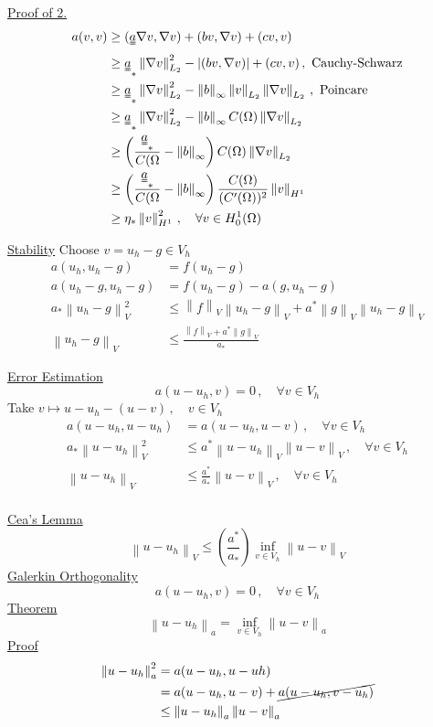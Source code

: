 \documentclass[letterpaper]{article}
\providecommand{\abs}[1]{\left\lvert#1\right\rvert}
\providecommand{\norm}[1]{\left\lVert#1\right\rVert}
\begin{document}
\begin{multicols}{2}
\uline{Proof of 2.}
\begin{align*}
a(v,v)&\ge(\uuline{a}\nabla v,\nabla v)+(bv,\nabla v)+(cv,v)\\
&\ge\uuline{a}_*\norm{\nabla v}_{L_2}^2-\abs{(bv,\nabla v)}+(cv,v)\,,
\text{ Cauchy-Schwarz}\\
&\ge\uuline{a}_*\norm{\nabla v}_{L_2}^2
-\norm{b}_\infty\norm{v}_{L_2}\norm{\nabla v}_{L_2}\,,\text{ Poincare}\\
&\ge\uuline{a}_*\norm{\nabla v}_{L_2}^2
-\norm{b}_\infty C(\Omega)\norm{\nabla v}_{L_2}\\
&\ge\left(\frac{\uuline{a}_*}{C(\Omega}
-\norm{b}_\infty\right) C(\Omega)\norm{\nabla v}_{L_2}\\
&\ge\left(\frac{\uuline{a}_*}{C(\Omega}
-\norm{b}_\infty\right)\frac{C(\Omega)}{(C'(\Omega))^2}\norm{v}_{H^1}\\
&\ge\eta_*\norm{v}_{H^1}^2\,,\quad\forall v\in H_0^1(\Omega)
\end{align*}

\uline{Stability} Choose $v=u_h-g\in V_h$
\begin{align*}
a(u_h,u_h-g)&=f(u_h-g)\\
a(u_h-g,u_h-g)&=f(u_h-g)-a(g,u_h-g)\\
a_*\norm{u_h-g}_V^2&\le\norm{f}_V\norm{u_h-g}_V+a^*\norm{g}_V\norm{u_h-g}_V\\
\norm{u_h-g}_V&\le\frac{\norm{f}_V+a^*\norm{g}_V}{a_*}
\end{align*}

\uline{Error Estimation} 
\[
a(u-u_h,v)=0\,,\quad\forall v\in V_h
\]
Take $v\mapsto u-u_h-(u-v)\,,\quad v\in V_h$
\begin{align*}
a(u-u_h,u-u_h)&=a(u-u_h,u-v)\,,\quad\forall v\in V_h\\
a_*\norm{u-u_h}_V^2&\le a^*\norm{u-u_h}_V\norm{u-v}_V\,,\quad\forall v\in V_h\\
\norm{u-u_h}_V&\le\frac{a^*}{a_*}\norm{u-v}_V\,,\quad\forall v\in V_h\\
\end{align*}

\uline{Cea's Lemma} 
\[
\norm{u-u_h}_V\le\left(\frac{a^*}{a_*}\right)\inf_{v\in V_h}\norm{u-v}_V
\]
\uline{Galerkin Orthogonality}
\[
a(u-u_h,v)=0\,,\quad\forall v\in V_h
\]
\uline{Theorem}
\[
\norm{u-u_h}_a=\inf_{v\in V_h}\norm{u-v}_a
\]
\uline{Proof}
\begin{align*}
\norm{u-u_h}_a^2&=a(u-u_h,u-uh)\\
&=a(u-u_h,u-v)+\cancel{a(u-u_h,v-u_h)}\\
&\le\norm{u-u_h}_a\norm{u-v}_a
\end{align*}


\end{multicols}
\end{document}

